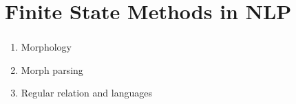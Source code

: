 \section{Finite State Methods in NLP}

\begin{frame}

	\begin{center}
		\Huge \insertsection
	\end{center}

\end{frame}


\begin{frame}

	\frametitle{\insertsection}
	
	\begin{enumerate}
		\item Morphology
		\item Morph parsing
		\item Regular relation and languages
	\end{enumerate}

\end{frame}